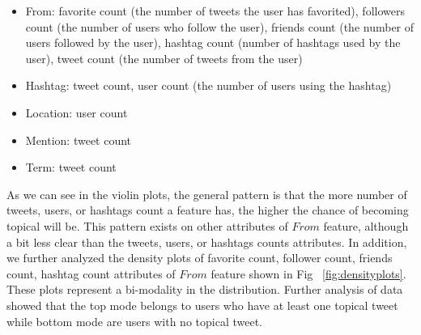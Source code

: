 \begin{itemize}
\item From: favorite count (the number of tweets the user has favorited), followers count (the number of users who follow the user), friends count (the number of users followed by the user), hashtag count (number of hashtags used by the user), tweet count (the number of tweets from the user)
\item Hashtag: tweet count, user count (the number of users using the hashtag)
\item Location: user count
\item Mention: tweet count
\item Term: tweet count
\end{itemize}

As we can see in the violin plots, the general pattern is that the more number of tweets, users, or hashtags count a feature has, the higher the chance of becoming topical will be. This pattern exists on other attributes of $From$ feature, although a bit less clear than the tweets, users, or hashtags counts attributes. 
In addition, we further analyzed the density plots of favorite count, follower count, friends count, hashtag count attributes of $From$ feature shown in Fig ~\ref{fig:densityplots}. These plots represent a bi-modality in the distribution. Further analysis of data showed that the top mode belongs to users who have at least one topical tweet while bottom mode are users with no topical tweet.

